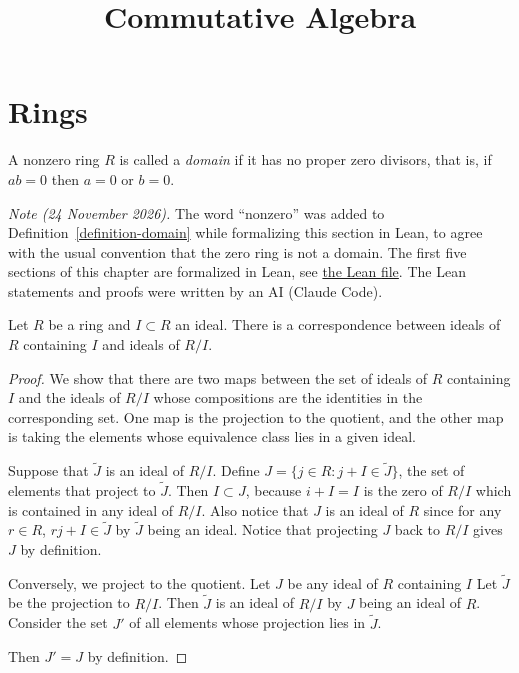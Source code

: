 



\title{Commutative Algebra}
\maketitle

\label{section-phantom}

\tableofcontents

\section{Rings}
\label{section-rings}

\begin{definition}
\label{definition-domain}
A nonzero ring $R$ is called
a {\it domain} if it has
no proper zero divisors,
that is, if $ab=0$ then $a=0$ or $b=0$.
\end{definition}

\medskip\noindent
{\it Note (24 November 2026).}
The word ``nonzero'' was added to
Definition~\ref{definition-domain}
while formalizing this section in Lean,
to agree with the usual convention
that the zero ring is not a domain.
The first five sections of this chapter
are formalized in Lean, see
\href{https://github.com/danimalabares/%
heap-project/blob/main/lean/HeapProject/%
CommutativeAlgebra/Basics.lean}
{the Lean file}.
The Lean statements and proofs
were written by an AI (Claude Code).

\begin{theorem}
\label{theorem-ideal-quoti-corre}
Let $R$ be a ring and $I \subset R$ an ideal.
There is a correspondence between ideals of
$R$ containing $I$
and ideals of $R/I$.
\end{theorem}

\begin{proof}
We show that there are two maps between the
set of ideals of $R$
containing $I$ and the ideals of $R/I$ whose
compositions
are the identities in the corresponding set.
One map is the projection
to the quotient, and the other map is taking
the elements
whose equivalence class lies in a given
ideal.

Suppose that $\tilde{J}$ is an ideal of
$R/I$.
Define $J=\{j \in R : j+I \in \tilde{J}\}$,
the set of elements that project to
$\tilde{J}$.
Then $I \subset J$, because $i + I = I$ is
the zero of $R/I$
which is contained in any ideal of $R/I$.
Also notice that $J$ is an ideal of $R$ since
for any $r \in R$,
$rj+I \in \tilde{J}$ by $\tilde{J}$ being an
ideal.
Notice that projecting $J$ back to $R/I$
gives $J$
by definition.

Conversely, we project to the quotient.
Let $J$ be any ideal of $R$ containing $I$
Let $\tilde{J}$ be the projection to $R/I$.
Then $\tilde{J}$ is an ideal of $R/I$ by $J$
being an ideal of $R$.
Consider the set $J'$ of all elements whose
projection lies in $\tilde{J}$.

Then $J'=J$ by definition.
\end{proof}

